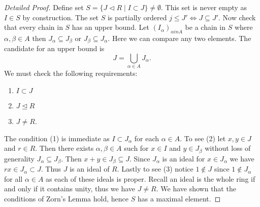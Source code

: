 \documentclass[master.tex]{subfiles}
\begin{document}
\begin{proof}[Detailed Proof]
  Define set \(S=\{J \lhd R \mid I \subset J\} \neq \emptyset\). This set is never empty as \(I \in S\) by
  construction. The set \(S\) is partially ordered \(j \le J' \iff J \subseteq J'\). Now check that every chain in \(S\)
  has an upper bound. Let \((I_\alpha)_{\alpha in A}\) be a chain in \(S\) where \(\alpha, \beta \in A\) then
  \(J_\alpha \subseteq J_\beta\) or \(J_\beta \subseteq J_\alpha\). Here we can compare any two elements. The candidate
  for an upper bound is
  \[J=\bigcup_{\alpha \in A} J_\alpha.\]
  We must check the following requirements:
  \begin{enumerate}[label=(\arabic*)]
   \item \(I \subset J\)
   \item \(J \unlhd R\)
   \item \(J \neq R\).
  \end{enumerate}
  The condition (1) is immediate as \(I \subset J_\alpha\) for each \(\alpha \in A\). To see (2) let \(x,y \in J\) and
  \(r \in R\). Then there exists \(\alpha, \beta \in A\) such for \(x \in I\) and \(y \in J_\beta\) without loss of
  generality \(J_\alpha \subseteq J_\beta\). Then \(x+y \in J_\beta \subseteq J\). Since \(J_\alpha\) is an ideal for \(x
  \in J_\alpha\) we have \(rx \in J_\alpha \subset J\). Thus \(J\) is an ideal of \(R\). Lastly to see (3) notice \(1
  \not \in J\) since \(1 \not \in J_\alpha\) for all \(\alpha \in A\) as each of these ideals is proper. Recall an ideal
  is the whole ring if and only if it contains unity, thus we have \(J \neq R\). We have shown that the conditions of
  Zorn's Lemma hold, hence \(S\) has a maximal element.
\end{proof}
\end{document}
